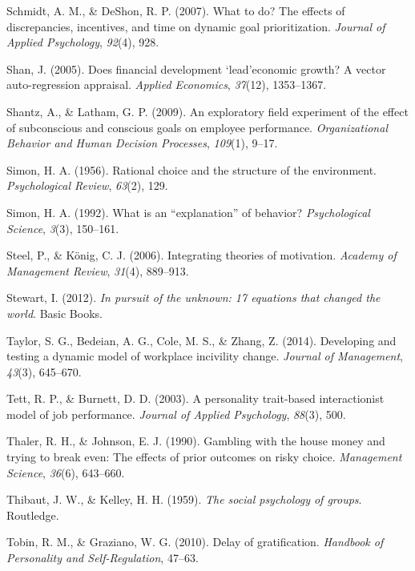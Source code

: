 \documentclass[english,man]{apa6}
\theoremstyle{definition}
\theoremstyle{definition}
\theoremstyle{definition}
\theoremstyle{remark}
\begin{document}
\hypertarget{ref-schmidt2007}{}
Schmidt, A. M., \& DeShon, R. P. (2007). What to do? The effects of
discrepancies, incentives, and time on dynamic goal prioritization.
\emph{Journal of Applied Psychology}, \emph{92}(4), 928.

\hypertarget{ref-shan2005}{}
Shan, J. (2005). Does financial development `lead'economic growth? A
vector auto-regression appraisal. \emph{Applied Economics},
\emph{37}(12), 1353--1367.

\hypertarget{ref-shantz2009}{}
Shantz, A., \& Latham, G. P. (2009). An exploratory field experiment of
the effect of subconscious and conscious goals on employee performance.
\emph{Organizational Behavior and Human Decision Processes},
\emph{109}(1), 9--17.

\hypertarget{ref-simon1956}{}
Simon, H. A. (1956). Rational choice and the structure of the
environment. \emph{Psychological Review}, \emph{63}(2), 129.

\hypertarget{ref-simon1992}{}
Simon, H. A. (1992). What is an ``explanation'' of behavior?
\emph{Psychological Science}, \emph{3}(3), 150--161.

\hypertarget{ref-steel2006}{}
Steel, P., \& König, C. J. (2006). Integrating theories of motivation.
\emph{Academy of Management Review}, \emph{31}(4), 889--913.

\hypertarget{ref-stewart2012}{}
Stewart, I. (2012). \emph{In pursuit of the unknown: 17 equations that
changed the world}. Basic Books.

\hypertarget{ref-taylor2014}{}
Taylor, S. G., Bedeian, A. G., Cole, M. S., \& Zhang, Z. (2014).
Developing and testing a dynamic model of workplace incivility change.
\emph{Journal of Management}, \emph{43}(3), 645--670.

\hypertarget{ref-tett2003}{}
Tett, R. P., \& Burnett, D. D. (2003). A personality trait-based
interactionist model of job performance. \emph{Journal of Applied
Psychology}, \emph{88}(3), 500.

\hypertarget{ref-thaler1990}{}
Thaler, R. H., \& Johnson, E. J. (1990). Gambling with the house money
and trying to break even: The effects of prior outcomes on risky choice.
\emph{Management Science}, \emph{36}(6), 643--660.

\hypertarget{ref-thibaut1959}{}
Thibaut, J. W., \& Kelley, H. H. (1959). \emph{The social psychology of
groups}. Routledge.

\hypertarget{ref-tobin2010}{}
Tobin, R. M., \& Graziano, W. G. (2010). Delay of gratification.
\emph{Handbook of Personality and Self-Regulation}, 47--63.
\end{document}
